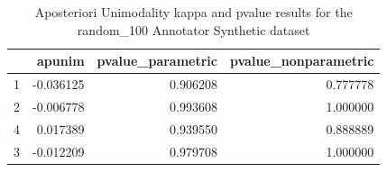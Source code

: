 \begin{table}
\caption{Aposteriori Unimodality kappa and pvalue results for the random_100 Annotator Synthetic dataset}
\label{tab:results_random_100}
\begin{tabular}{lrrr}
\toprule
 & apunim & pvalue\_parametric & pvalue\_nonparametric \\
\midrule
1 & -0.036125 & 0.906208 & 0.777778 \\
2 & -0.006778 & 0.993608 & 1.000000 \\
4 & 0.017389 & 0.939550 & 0.888889 \\
3 & -0.012209 & 0.979708 & 1.000000 \\
\bottomrule
\end{tabular}
\end{table}
